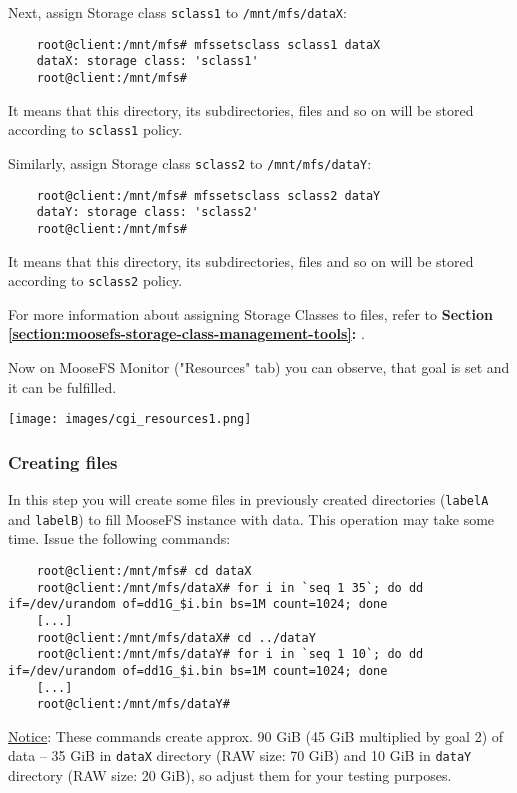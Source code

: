 \documentclass[a4paper,11pt,english]{report}
\def\code#1{\texttt{#1}}
\begin{document}
			Next, assign Storage class \code{sclass1} to \code{/mnt/mfs/dataX}:
			\begin{lstlisting}
	root@client:/mnt/mfs# mfssetsclass sclass1 dataX
	dataX: storage class: 'sclass1'
	root@client:/mnt/mfs#
			\end{lstlisting}
			
			It means that this directory, its subdirectories, files and so on will be stored according to \code{sclass1} policy.
			
			Similarly, assign Storage class \code{sclass2} to \code{/mnt/mfs/dataY}:
					
			\begin{lstlisting}
	root@client:/mnt/mfs# mfssetsclass sclass2 dataY
	dataY: storage class: 'sclass2'
	root@client:/mnt/mfs#
			\end{lstlisting}
			
			It means that this directory, its subdirectories, files and so on will be stored according to \code{sclass2} policy.
			
			
	
			
			For more information about assigning Storage Classes to files, refer to \textbf{Section \ref{section:moosefs-storage-class-management-tools}:  }.
			
			Now on MooseFS Monitor ("Resources" tab) you can observe, that goal is set and it can be fulfilled.
			
			\bigskip
			\texttt{[image: images/cgi\_resources1.png]}
				
				\subsubsection{Creating files}
				In this step you will create some files in previously created directories (\code{labelA} and \code{labelB}) to fill MooseFS instance with data. This operation may take some time. Issue the following commands:
				
				\begin{lstlisting}
	root@client:/mnt/mfs# cd dataX
	root@client:/mnt/mfs/dataX# for i in `seq 1 35`; do dd if=/dev/urandom of=dd1G_$i.bin bs=1M count=1024; done
	[...]
	root@client:/mnt/mfs/dataX# cd ../dataY
	root@client:/mnt/mfs/dataY# for i in `seq 1 10`; do dd if=/dev/urandom of=dd1G_$i.bin bs=1M count=1024; done
	[...]
	root@client:/mnt/mfs/dataY#
				\end{lstlisting}
				
				\underline{Notice}: These commands create approx. 90 GiB (45 GiB multiplied by goal 2) of data -- 35 GiB in \code{dataX} directory (RAW size: 70 GiB) and 10 GiB in \code{dataY} directory (RAW size: 20 GiB), so adjust them for your testing purposes.
	
\end{document}
